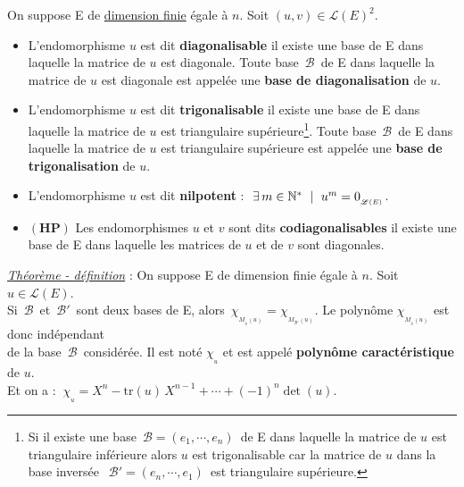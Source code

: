 \noindent On suppose E de \underline{dimension finie} égale à $n$. Soit \((u,v)\in \mathscr{L}(E)^2.\)
\begin{itemize}[leftmargin=0.5cm, label=•]
    \item L'endomorphisme $u$ est dit \textbf{diagonalisable} \ssi il existe une base de E dans laquelle la matrice de $u$ est diagonale. Toute base \(\,\mathcal{B}\,\) de E dans laquelle la matrice de $u$ est diagonale est appelée une \textbf{base de diagonalisation} de $u$.\vspace{.2cm}
    
    \item L'endomorphisme $u$ est dit \textbf{trigonalisable} \ssi il existe une base de E dans laquelle la matrice de $u$ est triangulaire supérieure\footnote{Si il existe une base \(\,\mathcal{B}=(e_1,\cdots,e_n)\,\) de E dans laquelle la matrice de $u$ est triangulaire inférieure alors $u$ est trigonalisable car la matrice de $u$ dans la base \guillemetleft inversée\guillemetright\, \(\;\mathcal{B}'=(e_n,\cdots,e_1)\,\) est triangulaire supérieure.\vspace{0.2cm}}. Toute base \(\,\mathcal{B}\,\) de E dans laquelle la matrice de $u$ est triangulaire supérieure est appelée une \textbf{base de trigonalisation} de $u$\vspace{0.2cm}.
    
    \item L'endomorphisme $u$ est dit \textbf{nilpotent} \ssi : \(\ \exists \, m\in \NN^* \ \mid \ u^m=0_{_{\mathscr{L}(E)}}\).\vspace{0.2cm}
    
    \item \(\left(\mathbf{H} \mathbf{P}\right) \) Les endomorphismes $u$ et $v$ sont dits \textbf{codiagonalisables} \ssi il existe une base de E dans laquelle les matrices de $u$ et de $v$ sont diagonales.
\end{itemize}

\vspace{1.5cm}

\underline{\emph{Théorème - définition}} : On suppose E de dimension finie égale à $n$. Soit \(u\in \mathscr{L}(E)\).\vspace{0.1cm}\\
Si \(\,\mathcal{B}\,\) et \(\,\mathcal{B}'\,\) sont deux bases de E, alors \(\,\chi_{_{M_{_{\mathcal{B}}}(u)}}=\chi_{_{M_{\mathcal{B}'}(u)}}\). Le polynôme \(\chi_{_{M_{_{\mathcal{B}}}(u)}}\) est donc indépendant\vspace{0.1cm}\\
de la base \(\,\mathcal{B}\,\) considérée. Il est noté \(\chi_{_u}\) et est appelé \textbf{polynôme caractéristique} de $u$.\vspace{0.15cm}\\
Et on a : \(\ \chi_{_u}=X^n-\text{tr}(u)\,X^{n-1}+\cdots+(-1)^n\det(u).\)
 
